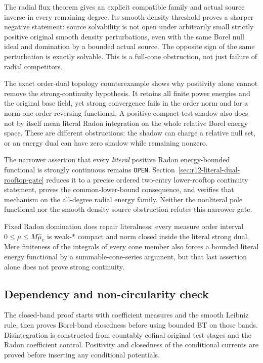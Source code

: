 \documentclass[11pt,a4paper]{article}
\numberwithin{equation}{section}
\theoremstyle{definition}
\theoremstyle{remark}
\begin{document}
The radial flux theorem gives an explicit compatible family
and actual source inverse in every remaining degree. Its
smooth-density threshold proves a sharper negative statement:
source solvability is not open under arbitrarily small strictly
positive original smooth density perturbations, even with the
same Borel null ideal and domination by a bounded actual source.
The opposite sign of the same perturbation is exactly solvable.
This is a full-cone obstruction, not just failure of radial
competitors.

The exact order-dual topology counterexample shows why positivity
alone cannot remove the strong-continuity hypothesis. It retains
all finite power energies and the original base field, yet
strong convergence fails in the order norm and for a norm-one
order-reversing functional. A positive compact-test shadow also
does not by itself mean literal Radon integration on the whole
relative Borel energy space. These are different obstructions:
the shadow can charge a relative null set, or an energy dual can
have zero shadow while remaining nonzero.

The narrower assertion that every \emph{literal} positive Radon
energy-bounded functional is strongly continuous remains
\texttt{OPEN}. Section~\ref{sec:r12-literal-dual-rooftop-gate}
reduces it to a precise ordered two-entry lower-rooftop
continuity statement, proves the common-lower-bound consequence,
and verifies that mechanism on the all-degree radial energy
family. Neither the nonliteral pole functional nor the smooth
density source obstruction refutes this narrower gate.

Fixed Radon domination does repair literalness: every measure
order interval $0\leq\mu\leq M\widehat\mu_v$ is weak-$*$ compact
and norm closed inside the literal strong dual. Mere finiteness
of the integrals of every cone member also forces a bounded
literal energy functional by a summable-cone-series argument,
but that last assertion alone does not prove strong continuity.

\subsection{Dependency and non-circularity check}

The closed-band proof starts with coefficient measures and the
smooth Leibniz rule, then proves Borel-band closedness before
using bounded BT on those bands. Disintegration is constructed
from countably cofinal original test stages and the Radon
coefficient control. Positivity and closedness of the conditional
currents are proved before inserting any conditional potentials.
\end{document}
